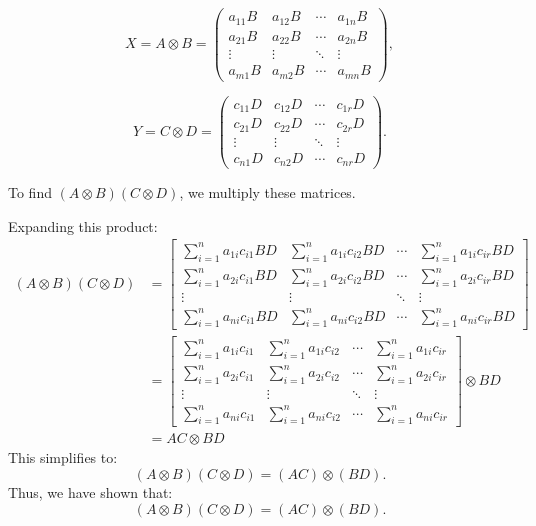 \[
X = A \otimes B = \begin{pmatrix}
a_{11} B & a_{12} B & \cdots & a_{1n} B \\
a_{21} B & a_{22} B & \cdots & a_{2n} B \\
\vdots & \vdots & \ddots & \vdots \\
a_{m1} B & a_{m2} B & \cdots & a_{mn} B
\end{pmatrix},
\]

\[
Y = C \otimes D = \begin{pmatrix}
c_{11} D & c_{12} D & \cdots & c_{1r} D \\
c_{21} D & c_{22} D & \cdots & c_{2r} D \\
\vdots & \vdots & \ddots & \vdots \\
c_{n1} D & c_{n2} D & \cdots & c_{nr} D
\end{pmatrix}.
\]

To find \((A \otimes B)(C \otimes D)\), we multiply these matrices.

Expanding this product:
\begin{align*}
(A \otimes B)(C \otimes D) &= \begin{bmatrix}
\sum_{i=1}^n a_{1i} c_{i1} BD & \sum_{i=1}^n a_{1i} c_{i2} BD & \cdots & \sum_{i=1}^n a_{1i} c_{ir} BD \\
\sum_{i=1}^n a_{2i} c_{i1} BD & \sum_{i=1}^n a_{2i} c_{i2} BD & \cdots & \sum_{i=1}^n a_{2i} c_{ir} BD \\
\vdots & \vdots & \ddots & \vdots \\
\sum_{i=1}^n a_{ni} c_{i1} BD & \sum_{i=1}^n a_{ni} c_{i2} BD & \cdots & \sum_{i=1}^n a_{ni} c_{ir} BD
\end{bmatrix}\\
&=\begin{bmatrix}
\sum_{i=1}^n a_{1i} c_{i1} & \sum_{i=1}^n a_{1i} c_{i2} & \cdots & \sum_{i=1}^n a_{1i} c_{ir} \\
\sum_{i=1}^n a_{2i} c_{i1} & \sum_{i=1}^n a_{2i} c_{i2} & \cdots & \sum_{i=1}^n a_{2i} c_{ir} \\
\vdots & \vdots & \ddots & \vdots \\
\sum_{i=1}^n a_{ni} c_{i1} & \sum_{i=1}^n a_{ni} c_{i2} & \cdots & \sum_{i=1}^n a_{ni} c_{ir}
\end{bmatrix} \otimes BD \\
&=AC \otimes BD
\end{align*}
This simplifies to:
\[
(A \otimes B)(C \otimes D) = \left( AC \right) \otimes \left( BD \right).
\]
Thus, we have shown that:
\[
(A \otimes B)(C \otimes D) = (AC) \otimes (BD).
\]


